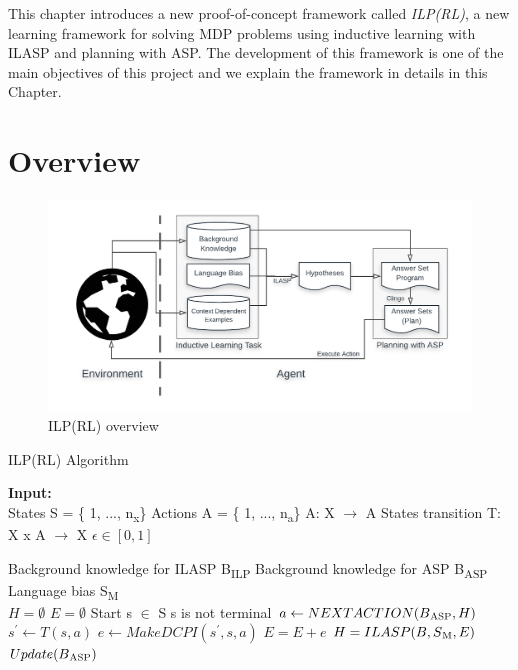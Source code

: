 This chapter introduces a new proof-of-concept framework called \textit{ILP(RL)}, a new learning framework for solving MDP problems using inductive learning with ILASP and planning with ASP.
The development of this framework is one of the main objectives of this project and we explain the framework in details in this Chapter.

\section{Overview}
\label{sec:overview}

\begin{figure}[!htb]
\centering
\includegraphics[width=1.0\textwidth]{./figures/architecture}
\caption{ILP(RL) overview}
\label{fig:ILPRL_overview}
\end{figure}

\begin{algorithm}
\caption{ILP(RL) Algorithm}\label{euclid}
\begin{algorithmic}[1]
\State \textbf{Input:} \\
\State States S = \{ 1, ..., n\textsubscript{x}\}
\State Actions A = \{ 1, ..., n\textsubscript{a}\} A: X $\rightarrow$ A
\State States transition T: X x A $\rightarrow$ X
\State $\epsilon \in [0,1]$

\State Background knowledge for ILASP B\textsubscript{ILP}
\State Background knowledge for ASP B\textsubscript{ASP}
\State Language bias S\textsubscript{M} \\

\State $H = \emptyset$
\State $E = \emptyset$
\State Start s $\in$ S
\While s is not terminal 
\State $a \leftarrow NEXTACTION(B\textsubscript{ASP}, H)$
\State $s^\prime \leftarrow T(s,a)$
\State $e \leftarrow MakeDCPI(s^\prime, s, a) $ 
\State $E = E + e$
\State $H = ILASP(B, S\textsubscript{M}, E)$
\EndIf
\State $Update(B\textsubscript{ASP})$
\EndWhile
\EndProcedure
\end{algorithmic}
\end{algorithm}

